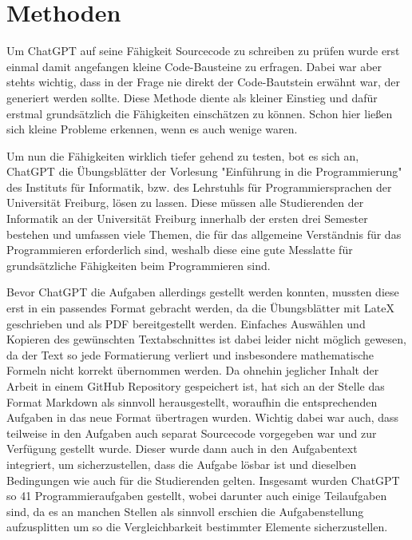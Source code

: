 \documentclass[class=scrbook, crop=false]{standalone}
\begin{document}
\chapter{Methoden}
\label{ch:methoden}
    Um ChatGPT auf seine Fähigkeit Sourcecode zu schreiben zu prüfen wurde erst einmal damit angefangen kleine Code-Bausteine zu erfragen.
    Dabei war aber stehts wichtig, dass in der Frage nie direkt der Code-Bautstein erwähnt war, der generiert werden sollte.
    Diese Methode diente als kleiner Einstieg und dafür erstmal grundsätzlich die Fähigkeiten einschätzen zu können.
    Schon hier ließen sich kleine Probleme erkennen, wenn es auch wenige waren.

    Um nun die Fähigkeiten wirklich tiefer gehend zu testen, bot es sich an, ChatGPT die Übungsblätter der Vorlesung "Einführung in die Programmierung"
    des Instituts für Informatik, bzw. des Lehrstuhls für Programmiersprachen der Universität Freiburg, lösen zu lassen.
    Diese müssen alle Studierenden der Informatik an der Universität Freiburg innerhalb der ersten drei Semester bestehen
    und umfassen viele Themen, die für das allgemeine Verständnis für das Programmieren erforderlich sind,
    weshalb diese eine gute Messlatte für grundsätzliche Fähigkeiten beim Programmieren sind.

    Bevor ChatGPT die Aufgaben allerdings gestellt werden konnten, mussten diese erst in ein passendes Format gebracht werden, da
    die Übungsblätter mit LateX geschrieben und als PDF bereitgestellt werden.
    Einfaches Auswählen und Kopieren des gewünschten Textabschnittes ist dabei leider nicht möglich gewesen, da der Text
    so jede Formatierung verliert und insbesondere mathematische Formeln nicht korrekt übernommen werden.
    Da ohnehin jeglicher Inhalt der Arbeit in einem GitHub Repository gespeichert ist,
    hat sich an der Stelle das Format Markdown als sinnvoll herausgestellt, woraufhin die entsprechenden Aufgaben in das neue Format übertragen wurden.
    Wichtig dabei war auch, dass teilweise in den Aufgaben auch separat Sourcecode vorgegeben war und zur Verfügung gestellt wurde.
    Dieser wurde dann auch in den Aufgabentext integriert, um sicherzustellen, dass die Aufgabe lösbar ist und dieselben Bedingungen wie auch für die Studierenden gelten.
    Insgesamt wurden ChatGPT so 41 Programmieraufgaben gestellt, wobei darunter auch einige Teilaufgaben sind, da es an manchen Stellen
    als sinnvoll erschien die Aufgabenstellung aufzusplitten um so die Vergleichbarkeit bestimmter Elemente sicherzustellen.
\end{document}
